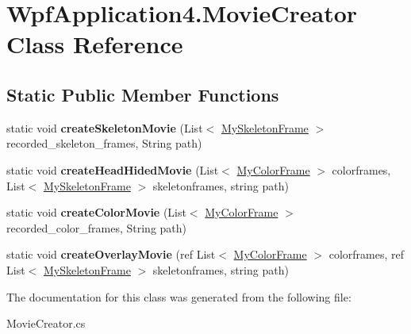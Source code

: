 \hypertarget{class_wpf_application4_1_1_movie_creator}{\section{Wpf\-Application4.\-Movie\-Creator Class Reference}
\label{class_wpf_application4_1_1_movie_creator}
}
\subsection*{Static Public Member Functions}
\begin{DoxyCompactItemize}
\item 
\hypertarget{class_wpf_application4_1_1_movie_creator_ade947bdba51fa29ff75e690f9cd90546}{static void {\bfseries create\-Skeleton\-Movie} (List$<$ \hyperlink{class_wpf_application4_1_1_my_skeleton_frame}{My\-Skeleton\-Frame} $>$ recorded\-\_\-skeleton\-\_\-frames, String path)}\label{class_wpf_application4_1_1_movie_creator_ade947bdba51fa29ff75e690f9cd90546}

\item 
\hypertarget{class_wpf_application4_1_1_movie_creator_a5eb73359f482591e033c4c1a1e723566}{static void {\bfseries create\-Head\-Hided\-Movie} (List$<$ \hyperlink{class_wpf_application4_1_1_my_color_frame}{My\-Color\-Frame} $>$ colorframes, List$<$ \hyperlink{class_wpf_application4_1_1_my_skeleton_frame}{My\-Skeleton\-Frame} $>$ skeletonframes, string path)}\label{class_wpf_application4_1_1_movie_creator_a5eb73359f482591e033c4c1a1e723566}

\item 
\hypertarget{class_wpf_application4_1_1_movie_creator_a4156c4cc9befa41f7644e086bd9cfbb7}{static void {\bfseries create\-Color\-Movie} (List$<$ \hyperlink{class_wpf_application4_1_1_my_color_frame}{My\-Color\-Frame} $>$ recorded\-\_\-color\-\_\-frames, String path)}\label{class_wpf_application4_1_1_movie_creator_a4156c4cc9befa41f7644e086bd9cfbb7}

\item 
\hypertarget{class_wpf_application4_1_1_movie_creator_a302cd183531ec3f2eeebabc2d8d459b6}{static void {\bfseries create\-Overlay\-Movie} (ref List$<$ \hyperlink{class_wpf_application4_1_1_my_color_frame}{My\-Color\-Frame} $>$ colorframes, ref List$<$ \hyperlink{class_wpf_application4_1_1_my_skeleton_frame}{My\-Skeleton\-Frame} $>$ skeletonframes, string path)}\label{class_wpf_application4_1_1_movie_creator_a302cd183531ec3f2eeebabc2d8d459b6}

\end{DoxyCompactItemize}


The documentation for this class was generated from the following file\-:\begin{DoxyCompactItemize}
\item 
Movie\-Creator.\-cs\end{DoxyCompactItemize}
